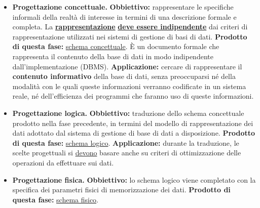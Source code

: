 \documentclass[a4paper]{article}
\begin{document}
	\begin{itemize}
		\item[\ding{42}] \textbf{Progettazione concettuale.}\newline
		\textcolor{Red3}{\textbf{Obbiettivo:}} rappresentare le specifiche informali della realtà di interesse in termini di una descrizione formale e completa. La \textbf{\underline{rappresentazione}} \textbf{\underline{deve essere indipendente}} dai criteri di rappresentazione utilizzati nei sistemi di gestione di basi di dati.\newline
		\textcolor{Green4}{\textbf{Prodotto di questa fase:}} \underline{schema concettuale}. È un documento formale che rappresenta il contenuto della base di dati in modo indipendente dall'implementazione (DBMS).\newline
		\textcolor{Blue3}{\textbf{Applicazione:}} cercare di rappresentare il \textbf{contenuto informativo} della base di dati, senza preoccuparsi né della modalità con le quali queste informazioni verranno codificate in un sistema reale, né dell'efficienza dei programmi che faranno uso di queste informazioni.\label{def: progettazione concettuale}
		
		\item[\ding{42}] \textbf{Progettazione logica.}\newline
		\textcolor{Red3}{\textbf{Obbiettivo:}} traduzione dello schema concettuale prodotto nella fase precedente, in termini del modello di rappresentazione dei dati adottato dal sistema di gestione di base di dati a disposizione.\newline
		\textcolor{Green4}{\textbf{Prodotto di questa fase:}} \underline{schema logico}.\newline
		\textcolor{Blue3}{\textbf{Applicazione:}} durante la traduzione, le scelte progettuali si \underline{devono} basare anche su criteri di ottimizzazione delle operazioni da effettuare sui dati.\label{def: progettazione logica}
		
		\item[\ding{42}] \textbf{Progettazione fisica.}\newline
		\textcolor{Red3}{\textbf{Obbiettivo:}} lo schema logico viene completato con la specifica dei parametri fisici di memorizzazione dei dati.\newline
		\textcolor{Green4}{\textbf{Prodotto di questa fase:}} \underline{schema fisico}.\newline\label{def: progettazione fisica}
	\end{itemize}
\end{document}
